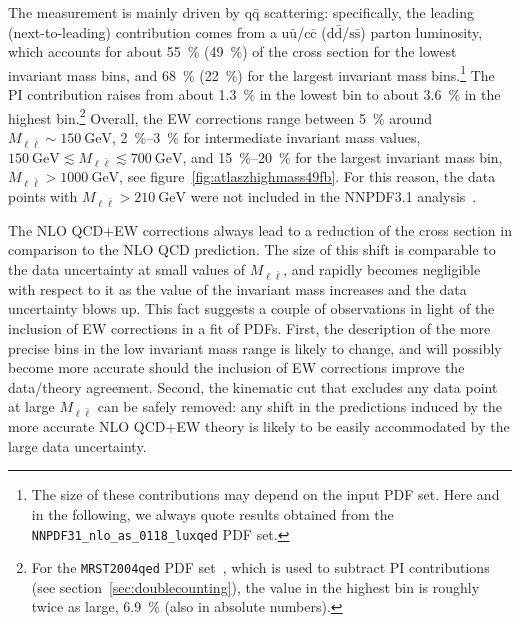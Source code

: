 The measurement is mainly driven by $\mathrm{q}\bar{\mathrm{q}}$ scattering: specifically, the
leading (next-to-leading) contribution comes from a $\mathrm{u}\bar{\mathrm{u}}$/$\mathrm{c}\bar{\mathrm{c}}$ ($\mathrm{d}\bar{\mathrm{d}}$/$\mathrm{s}\bar{\mathrm{s}}$)
parton luminosity, which accounts for about \SI{55}{\percent} (\SI{49}{\percent}) of the cross section
for the lowest invariant mass bins, and \SI{68}{\percent} (\SI{22}{\percent}) for the largest invariant
mass bins.\footnote{The size of these contributions may depend on the input PDF
  set. Here and in the following, we always quote results obtained from the
  \texttt{NNPDF31\_nlo\_as\_0118\_luxqed} PDF set.}
The PI contribution raises from about \SI{1.3}{\percent} in the lowest bin to
about \SI{3.6}{\percent} in the highest bin.\footnote{For the \texttt{MRST2004qed} PDF set~\cite{Martin:2004dh}, which is used to subtract PI contributions (see section~\ref{sec:doublecounting}), the value in the highest bin is roughly twice as large, \SI{6.9}{\percent} (also in absolute numbers).}
Overall, the EW corrections range between \SI{5}{\percent}
around $M_{\ell\bar\ell}\sim \SI{150}{\giga\electronvolt}$, \SIrange{2}{3}{\percent} for intermediate invariant mass
values, $\SI{150}{\giga\electronvolt}\lesssim M_{\ell\bar\ell}\lesssim \SI{700}{\giga\electronvolt}$, and
\SIrange{15}{20}{\percent} for the largest invariant mass bin, $M_{\ell\bar\ell}>\SI{1000}{\giga\electronvolt}$,
see figure~\ref{fig:atlaszhighmass49fb}. For this reason, the data points with
$M_{\ell\bar\ell}>\SI{210}{\giga\electronvolt}$ were not included in the NNPDF3.1
analysis~\cite{Ball:2017nwa}.

The NLO QCD+EW corrections always lead to a reduction of the cross section in
comparison to the NLO QCD prediction. The size of this shift is comparable to
the data uncertainty at small values of $M_{\ell\bar\ell}$, and rapidly becomes
negligible with respect to it as the value of the invariant mass increases
and the data uncertainty blows up. This fact suggests a couple of observations
in light of the inclusion of EW corrections in a fit of PDFs. First, the
description of the more precise bins in the low invariant mass range is likely
to change, and will possibly become more accurate should the inclusion of EW
corrections improve the data/theory agreement. Second, the kinematic cut that
excludes any data point at large $M_{\ell\bar\ell}$ can be safely removed: any
shift in the predictions induced by the more accurate NLO QCD+EW theory is
likely to be easily accommodated by the large data uncertainty.

